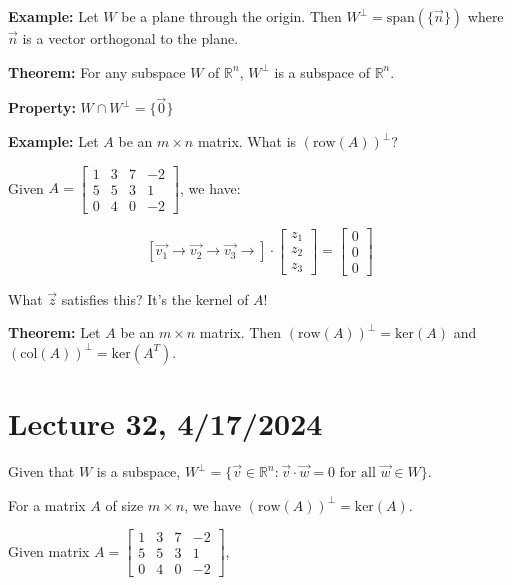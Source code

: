 \documentclass{article}
\begin{document}
\textbf{Example:} Let \( W \) be a plane through the origin. Then \( W^{\perp} = \text{span}(\{\vec{n}\}) \) where \( \vec{n} \) is a vector orthogonal to the plane.

\textbf{Theorem:} For any subspace \( W \) of \( \mathbb{R}^n \), \( W^{\perp} \) is a subspace of $\mathbb{R}^n$.

\textbf{Property:} \( W \cap W^{\perp} = \{\vec{0}\} \)

\textbf{Example:} Let \( A \) be an \( m \times n \) matrix. What is \( (\text{row}(A))^{\perp} \)?

Given \( A = \begin{bmatrix} 1 & 3 & 7 & -2 \\ 5 & 5 & 3 & 1 \\ 0 & 4 & 0 & -2 \end{bmatrix} \), we have:

\[ \left[\vec{v_1} \rightarrow \vec{v_2} \rightarrow \vec{v_3} \rightarrow \right] \cdot \begin{bmatrix} z_1 \\ z_2 \\ z_3 \end{bmatrix} = \begin{bmatrix} 0 \\ 0 \\ 0 \end{bmatrix} \]

What \( \vec{z} \) satisfies this? It's the kernel of \( A \)!

\textbf{Theorem:} Let \( A \) be an \( m \times n \) matrix. Then \( (\text{row}(A))^{\perp} = \text{ker}(A) \) and \( (\text{col}(A))^{\perp} = \text{ker}(A^T) \).


\section{Lecture 32, 4/17/2024}


Given that \( W \) is a subspace, \( W^{\perp} = \{\vec{v} \in \mathbb{R}^n : \vec{v} \cdot \vec{w} = 0 \text{ for all } \vec{w} \in W\} \).

For a matrix \( A \) of size \( m \times n \), we have \( (\text{row}(A))^{\perp} = \text{ker}(A) \).

Given matrix \( A = \begin{bmatrix} 1 & 3 & 7 & -2 \\ 5 & 5 & 3 & 1 \\ 0 & 4 & 0 & -2 \end{bmatrix} \),
\end{document}
